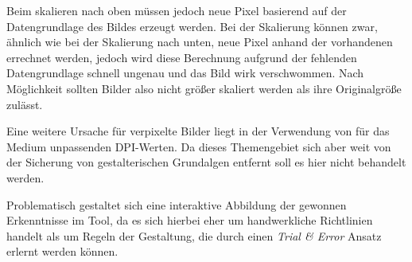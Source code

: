 Beim skalieren nach oben müssen jedoch neue Pixel basierend auf der Datengrundlage des Bildes erzeugt werden. Bei der Skalierung können zwar, ähnlich wie bei der Skalierung nach unten, neue Pixel anhand der vorhandenen errechnet werden, jedoch wird diese Berechnung aufgrund der fehlenden Datengrundlage schnell ungenau und das Bild wirk verschwommen. Nach Möglichkeit sollten Bilder also nicht größer skaliert werden als ihre Originalgröße zulässt.

Eine weitere Ursache für verpixelte Bilder liegt in der Verwendung von für das Medium unpassenden DPI-Werten. Da dieses Themengebiet sich aber weit von der Sicherung von gestalterischen Grundalgen entfernt soll es hier nicht behandelt werden.

Problematisch gestaltet sich eine interaktive Abbildung der gewonnen Erkenntnisse im Tool, da es sich hierbei eher um handwerkliche Richtlinien handelt als um Regeln der Gestaltung, die durch einen \textit{Trial \& Error} Ansatz erlernt werden können.